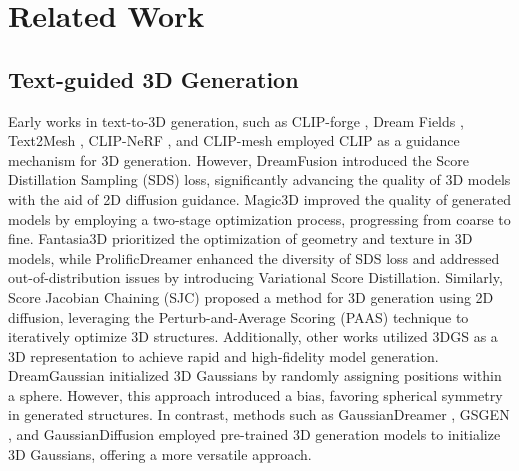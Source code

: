 \section{Related Work}
\subsection{Text-guided 3D Generation}

Early works in text-to-3D generation, such as CLIP-forge \cite{sanghi2022clip}, Dream Fields \cite{jain2022zero}, Text2Mesh \cite{michel2022text2mesh}, CLIP-NeRF \cite{wang2022clip}, and CLIP-mesh \cite{mohammad2022clip} employed CLIP as a guidance mechanism for 3D generation. However, DreamFusion \cite{poole2022dreamfusion} introduced the Score Distillation Sampling (SDS) loss, significantly advancing the quality of 3D models with the aid of 2D diffusion guidance. Magic3D \cite{lin2023magic3d} improved the quality of generated models by employing a two-stage optimization process, progressing from coarse to fine. Fantasia3D \cite{chen2023fantasia3d} prioritized the optimization of geometry and texture in 3D models, while ProlificDreamer \cite{wang2024prolificdreamer} enhanced the diversity of SDS loss and addressed out-of-distribution issues by introducing Variational Score Distillation. Similarly, Score Jacobian Chaining (SJC) \cite{wang2023score} proposed a method for 3D generation using 2D diffusion, leveraging the Perturb-and-Average Scoring (PAAS) technique to iteratively optimize 3D structures. Additionally, other works utilized 3DGS as a 3D representation to achieve rapid and high-fidelity model generation. DreamGaussian \cite{tang2023dreamgaussian} initialized 3D Gaussians by randomly assigning positions within a sphere. However, this approach introduced a bias, favoring spherical symmetry in generated structures. In contrast, methods such as GaussianDreamer \cite{yi2023gaussiandreamer}, GSGEN \cite{chen2024text}, and GaussianDiffusion \cite{li2023gaussiandiffusion} employed pre-trained 3D generation models to initialize 3D Gaussians, offering a more versatile approach.

